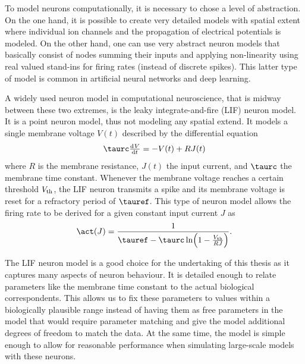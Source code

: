 To model neurons computationally, it is necessary to chose a level of abstraction.
On the one hand, it is possible to create very detailed models with spatial extent \parencite[e.g.,][]{markram2015,bahl2012} where individual ion channels and the propagation of electrical potentials is modeled.
On the other hand, one can use very abstract neuron models that basically consist of nodes summing their inputs and applying non-linearity using real valued stand-ins for firing rates (instead of discrete spikes).
This latter type of model is common in artificial neural networks and deep learning.

A widely used neuron model in computational neuroscience, that is midway between these two extremes, is the leaky integrate-and-fire (LIF) neuron model.
It is a point neuron model, thus not modeling any spatial extend.
It models a single membrane voltage $V(t)$ described by the differential equation
\begin{equation}
    \taurc \od{V}{t} = -V(t) + R J(t)
\end{equation}
where $R$ is the membrane resistance, $J(t)$ the input current, and $\taurc$ the membrane time constant.
Whenever the membrane voltage reaches a certain threshold $V_{{\mathrm{th}}}$, the LIF neuron transmits a spike and its membrane voltage is reset for a refractory period of $\tauref$.
This type of neuron model allows the firing rate to be derived for a given constant input current $J$ as
\begin{equation}
    \act(J) = \frac{1}{\tauref - \taurc \ln\!\del{1 - \frac{V_{\ped{th}}}{R J}}} \text{.}
\end{equation}

The LIF neuron model is a good choice for the undertaking of this thesis as it captures many aspects of neuron behaviour.
It is detailed enough to relate parameters like the membrane time constant to the actual biological correspondents.
This allows us to fix these parameters to values within a biologically plausible range instead of having them as free parameters in the model that would require parameter matching and give the model additional degrees of freedom to match the data.
At the same time, the model is simple enough to allow for reasonable performance when simulating large-scale models with these neurons.
